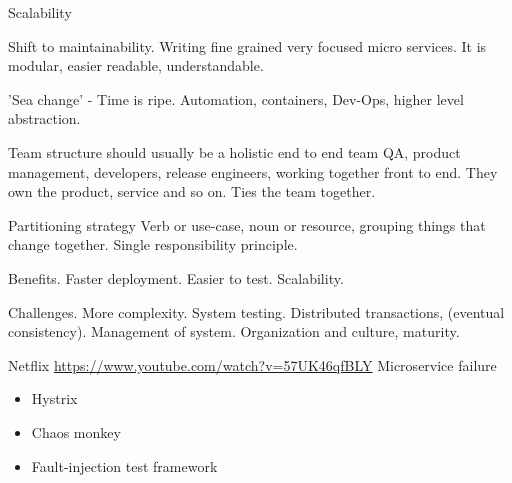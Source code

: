 Scalability 

Shift to maintainability. Writing fine grained very focused micro services. It is modular, easier readable, understandable.

'Sea change' - Time is ripe. Automation, containers, Dev-Ops, higher level abstraction.

Team structure should usually be a holistic end to end team QA, product management, developers, release engineers, working together front to end. They own the product, service and so on. Ties the team together.

Partitioning strategy Verb or use-case, noun or resource, grouping things that change together. Single responsibility principle.

Benefits. Faster deployment. Easier to test. Scalability.

Challenges.
More complexity. System testing. Distributed transactions, (eventual consistency). Management of system.
Organization and culture, maturity.

Netflix
\url{https://www.youtube.com/watch?v=57UK46qfBLY}
Microservice failure
\begin{itemize}
\item Hystrix
\item Chaos monkey
\item Fault-injection test framework
\end{itemize}
